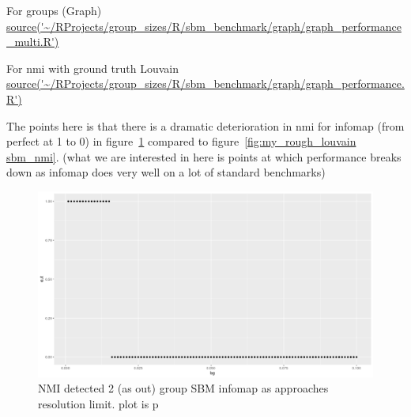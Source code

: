 For groups (Graph)  \url{source('~/RProjects/group_sizes/R/sbm_benchmark/graph/graph_performance_multi.R')}

For nmi with ground truth Louvain
\url{source('~/RProjects/group_sizes/R/sbm_benchmark/graph/graph_performance.R')}

The points here is that there is a dramatic deterioration in nmi for infomap (from perfect at 1 to 0) in figure~\ref{fig:my_rough_infomap} compared to figure~\ref{fig:my_rough_louvain sbm_nmi}. (what we are interested in here is points at which performance breaks down as infomap does very well on a lot of standard benchmarks)


\begin{figure}
    \centering
    \includegraphics[width=\textwidth]{images/Rplot_rough_infomap_nmi_sbm.png}
    \caption{NMI detected 2 (as out) group SBM infomap as approaches resolution limit. plot is p}
    \label{fig:my_rough_infomap}
\end{figure}

